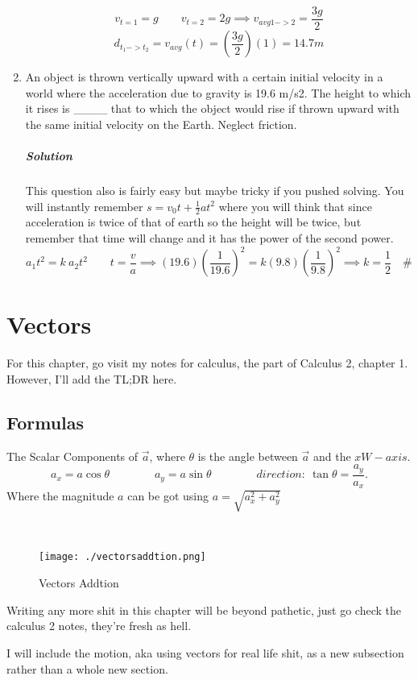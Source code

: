 \documentclass{article}
\begin{document}
\begin{enumerate}[1.]
		\[
			v_{t=1} = g \qquad v_{t=2} = 2g \implies v_{avg 1->2}= \frac{ 3g }{ 2 }  	
		\]
		\[
			d_{t_1->t_2} = v_{avg} (t) = \left( \frac{ 3g }{ 2 }  \right	) (1) = 14.7m	
		\]

	\item An object is thrown vertically upward with a certain initial velocity in a world where the acceleration due to gravity is 19.6 m/s2. The height to which it rises is \_\_\_\_ that to which the object would rise if thrown upward with the same initial velocity on the Earth. Neglect friction.
		\subparagraph{Solution}
		This question also is fairly easy but maybe tricky if you pushed solving. You will instantly remember $ s = v_0 t + \frac{1}{2} a t^2 $  	 where you will think that since acceleration is twice of that of earth so the height will be twice, but remember that time will change and it has the power of the second power.
		\[
			a_1 t^2 = k\ a_2 t^2 \qquad t = \frac{v}{a} \implies (19.6) \left( \frac{1}{19.6} \right)^2 = k (9.8) \left( \frac{1}{9.8}  \right)^2 \implies k = \frac{1}{2} \quad \#
		\]
\end{enumerate}
\newpage

\section{Vectors}
For this chapter, go visit my notes for calculus, the part of Calculus 2, chapter 1. However, I'll add the TL;DR here.

\subsection{Formulas}

The Scalar Components of $ \vec{ a } $, where $\theta$ is the angle between $ \vec{ a }$ and the $ xW- axis $.
\[
	a_x = a \cos{ \theta } \qquad \qquad a_y = a \sin{ \theta }  \qquad \qquad direction:\ \tan{ \theta } =\frac{a_y}{a_x}.
\]
Where the magnitude $a$ can be got using $ a = \sqrt{ a_x^2 + a_y^2 } $

\

\begin{figure}[h!]
	\centering
	\texttt{[image: ./vectorsaddtion.png]}
	\caption{Vectors Addtion}
	\label{fig:-vectorsaddtion-png}
\end{figure}

Writing any more shit in this chapter will be beyond pathetic, just go check the calculus 2 notes, they're fresh as hell.

I will include the motion, aka using vectors for real life shit, as a new subsection rather than a whole new section.
\end{document}
